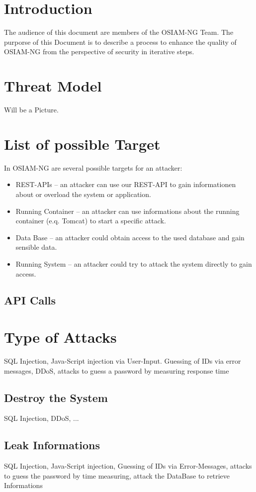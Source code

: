 \section{Introduction}

The audience of this document are members of the OSIAM-NG Team.
The purporse of this Document is to describe a process to enhance the quality of
OSIAM-NG from the perspective of security in iterative steps.

\section{Threat Model}
Will be a Picture.

\section{List of possible Target}
In OSIAM-NG are several possible targets for an attacker:
\begin{itemize}
\item REST-APIs -- an attacker can use our REST-API to gain informationen about or overload the system or application.
\item Running Container -- an attacker can use informations about the running container (e.q. Tomcat) to start a specific attack.
\item Data Base -- an attacker could obtain access to the used database and gain sensible data.
\item Running System -- an attacker could try to attack the system directly to gain access.
\end{itemize}

\subsection{API Calls}

\section{Type of Attacks}
SQL Injection, Java-Script injection via User-Input.
Guessing of IDs via error messages, DDoS, 
attacks to guess a password by measuring response time
\subsection{Destroy the System}
SQL Injection, DDoS, ...

\subsection{Leak Informations}
SQL Injection, Java-Script injection, Guessing of IDs via Error-Messages, 
attacks to guess the password by time measuring, attack the DataBase to retrieve Informations

